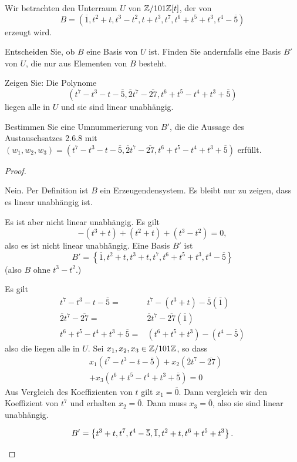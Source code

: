 \begin{Problem}
	Wir betrachten den Unterraum $U$ von $\mathbb{Z} / 101\mathbb{Z}[t]$, der von
	\[
	B=\left( \overline{1},t^2+t,t^3-t^2,t+t^3,t^7,t^6+t^5+t^3,t^4-\overline{5} \right)\] erzeugt wird.
	\begin{parts}
		\item Entscheiden Sie, ob $B$ eine Basis von $U$ ist. Finden Sie andernfalls eine Basis $B'$ von $U$, die nur aus Elementen von $B$ besteht.
		\item Zeigen Sie: Die Polynome
			\[
				(t^7-t^3-t-\overline{5}, \overline{2}t^7-\overline{27},t^6+t^5-t^4+t^3+\overline{5})\] liegen alle in $U$ und sie sind linear unabhängig.
			\item Bestimmen Sie eine Umnummerierung von $B'$, die die Aussage des Austauschsatzes 2.6.8 mit $(w_1,w_2,w_3)=(t^7-t^3-t-\overline{5},\overline{2}t^7-\overline{27},t^6+t^5-t^4+t^3+\overline{5})$ erfüllt.
	\end{parts}
\end{Problem}
\begin{proof}
	\begin{parts}
	\item Nein. Per Definition ist $B$ ein Erzeugendensystem. Es bleibt nur zu zeigen, dass es linear unabhängig ist.

		Es ist aber nicht linear unabhängig. Es gilt
		\[
			-(t^3+t)+(t^2+t)+(t^3-t^2)=0
		,\] 
		also es ist nicht linear unabhängig. Eine Basis $B'$ ist
		\[
		B'=\left\{ \overline{1},t^2+t,t^3+t,t^7,t^6+t^5+t^3,t^4-\overline{5} \right\} 
		\] 
		(also $B$ ohne $t^3-t^2$.)
	\item Es gilt
		\begin{align*}
			t^7-t^3-t-\overline{5}=&t^7-(t^3+t)-\overline{5}(\overline{1})\\
			\overline{2}t^7-\overline{27}=&\overline{2}t^7-\overline{27}(\overline{1})\\
			t^6+t^5-t^4+t^3+\overline{5}=&(t^6+t^5+t^3)-(t^4-\overline{5})
		\end{align*}
		also die liegen alle in $U$. Sei $x_1,x_2,x_3\in \mathbb{Z} / 101\mathbb{Z}$, so dass
		\begin{align*}
			&x_1(t^7-t^3-t-\overline{5})+x_2(\overline{2}t^7-\overline{27})\\
			&+x_3(t^6+t^5-t^4+t^3+\overline{5})=0
		\end{align*}
		Aus Vergleich des Koeffizienten von $t$ gilt $x_1=\overline{0}$. Dann vergleich wir den Koeffizient von $t^7$ und erhalten $x_2=\overline{0}$. Dann muss $x_3=\overline{0}$, also sie sind linear unabhängig.
	\item 
		\[
			B'=\left\{ t^3+t,t^7,t^4-\overline{5},\overline{1},t^2+t,t^6+t^5+t^3 \right\} 
		.\qedhere\] 
	\end{parts}
\end{proof}
